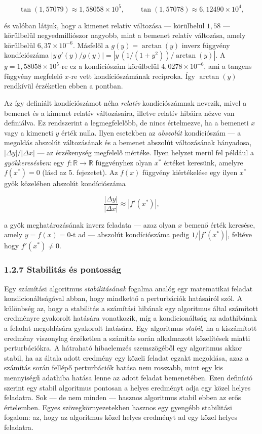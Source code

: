 \documentclass[
  magyar,
  11pt]{article}
\begin{document}
\[\tan(1{,}57079) \approx 1{,}58058 \times 10^5, \qquad \tan(1{,}57078) \approx 6{,}12490 \times 10^4,\]

és valóban látjuk, hogy a kimenet relatív változása --- körülbelül
\(1{,}58\) --- körülbelül negyedmilliószor nagyobb, mint a bemenet
relatív változása, amely körülbelül \(6{,}37 \times 10^{-6}\). Másfelől
a \(g(y) = \arctan(y)\) inverz függvény kondíciószáma
\(|y\,g'(y)/g(y)| = |y\,(1/(1+y^2))/\arctan(y)|\). A
\(y = 1{,}58058 \times 10^5\)-re ez a kondíciószám körülbelül
\(4{,}0278 \times 10^{-6}\), ami a tangens függvény megfelelő \(x\)-re
vett kondíciószámának reciproka. Így \(\arctan(y)\) rendkívül érzéketlen
ebben a pontban.

Az így definiált kondíciószámot néha \emph{relatív} kondíciószámnak
nevezik, mivel a bemenet és a kimenet relatív változásaira, illetve
relatív hibáira nézve van definiálva. Ez rendszerint a legmegfelelőbb,
de nincs értelmezve, ha a bemeneti \(x\) vagy a kimeneti \(y\) érték
nulla. Ilyen esetekben az \emph{abszolút} kondíciószám --- a megoldás
abszolút változásának és a bemenet abszolút változásának hányadosa,
\(|\Delta y|/|\Delta x|\) --- az érzékenység megfelelő mértéke. Ilyen
helyzet merül fel például a \emph{gyökkeresésben}: egy
\(f: \mathbb{R} \to \mathbb{R}\) függvényhez olyan \(x^*\) értéket
keresünk, amelyre \(f(x^*) = 0\) (lásd az 5. fejezetet). Az \(f(x)\)
függvény kiértékelése egy ilyen \(x^*\) gyök közelében abszolút
kondíciószáma

\[\frac{|\Delta y|}{|\Delta x|} \approx |f'(x^*)|,\]

a gyök meghatározásának inverz feladata --- azaz olyan \(x\) bemenő
érték keresése, amely \(y = f(x) = 0\)-t ad --- abszolút kondíciószáma
pedig \(1/|f'(x^*)|\), feltéve hogy \(f'(x^*) \neq 0\).

\subsubsection{1.2.7 Stabilitás és
pontosság}\label{stabilituxe1s-uxe9s-pontossuxe1g}

Egy számítási algoritmus \emph{stabilitásának} fogalma analóg egy
matematikai feladat kondicionáltságával abban, hogy mindkettő a
perturbációk hatásairól szól. A különbség az, hogy a stabilitás a
számítási hibának egy algoritmus által számított eredményre gyakorolt
hatására vonatkozik, míg a kondicionáltság az adathibának a feladat
megoldására gyakorolt hatására. Egy algoritmus \emph{stabil}, ha a
kiszámított eredmény viszonylag érzéketlen a számítás során alkalmazott
közelítések miatti perturbációkra. A hátraható hibaelemzés szemszögéből
egy algoritmus akkor stabil, ha az általa adott eredmény egy közeli
feladat egzakt megoldása, azaz a számítás során fellépő perturbációk
hatása nem rosszabb, mint egy kis mennyiségű adathiba hatása lenne az
adott feladat bemenetében. Ezen definíció szerint egy stabil algoritmus
pontosan a helyes eredményt adja egy közel helyes feladatra. Sok --- de
nem minden --- hasznos algoritmus stabil ebben az erős értelemben. Egyes
szövegkörnyezetekben hasznos egy gyengébb stabilitási fogalom: az, hogy
az algoritmus közel helyes eredményt ad egy közel helyes feladatra.
\end{document}
